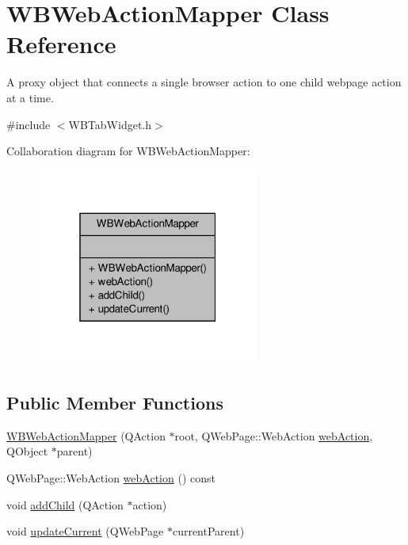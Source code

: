 \hypertarget{class_w_b_web_action_mapper}{\section{W\-B\-Web\-Action\-Mapper Class Reference}
\label{df/ddf/class_w_b_web_action_mapper}
}


A proxy object that connects a single browser action to one child webpage action at a time.  




{\ttfamily \#include $<$W\-B\-Tab\-Widget.\-h$>$}



Collaboration diagram for W\-B\-Web\-Action\-Mapper\-:
\nopagebreak
\begin{figure}[H]
\begin{center}
\leavevmode
\includegraphics[width=208pt]{dd/dd6/class_w_b_web_action_mapper__coll__graph}
\end{center}
\end{figure}
\subsection*{Public Member Functions}
\begin{DoxyCompactItemize}
\item 
\hyperlink{class_w_b_web_action_mapper_ad9b3b037a503226176745c497b26f2cb}{W\-B\-Web\-Action\-Mapper} (Q\-Action $\ast$root, Q\-Web\-Page\-::\-Web\-Action \hyperlink{class_w_b_web_action_mapper_a93022e933f82d86a438d9ccdfe72d93f}{web\-Action}, Q\-Object $\ast$parent)
\item 
Q\-Web\-Page\-::\-Web\-Action \hyperlink{class_w_b_web_action_mapper_a93022e933f82d86a438d9ccdfe72d93f}{web\-Action} () const 
\item 
void \hyperlink{class_w_b_web_action_mapper_a57629da574d3dde2d40ebb3dad324b24}{add\-Child} (Q\-Action $\ast$action)
\item 
void \hyperlink{class_w_b_web_action_mapper_a6ab4f245f921fa06f9d8d419a4bd5b52}{update\-Current} (Q\-Web\-Page $\ast$current\-Parent)
\end{DoxyCompactItemize}


